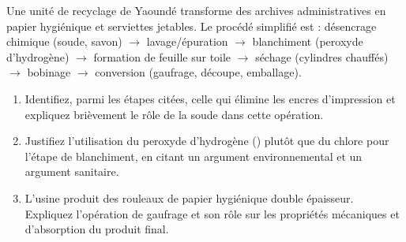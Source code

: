 \documentclass[11pt]{article}
\begin{document}
\begin{exercice}
Une unité de recyclage de Yaoundé transforme des archives administratives en papier hygiénique et serviettes jetables. Le procédé simplifié est : désencrage chimique (soude, savon) $\rightarrow$ lavage/épuration $\rightarrow$ blanchiment (peroxyde d'hydrogène) $\rightarrow$ formation de feuille sur toile $\rightarrow$ séchage (cylindres chauffés) $\rightarrow$ bobinage $\rightarrow$ conversion (gaufrage, découpe, emballage).
\begin{enumerate}
    \item Identifiez, parmi les étapes citées, celle qui élimine les encres d'impression et expliquez brièvement le rôle de la soude dans cette opération.
    \item Justifiez l'utilisation du peroxyde d'hydrogène () plutôt que du chlore pour l'étape de blanchiment, en citant un argument environnemental et un argument sanitaire.
    \item L'usine produit des rouleaux de papier hygiénique \og double épaisseur\fg{}. Expliquez l'opération de gaufrage et son rôle sur les propriétés mécaniques et d'absorption du produit final.
\end{enumerate}
\end{exercice}
\end{document}
